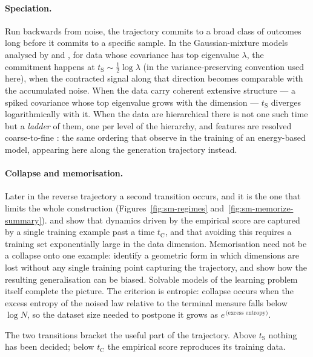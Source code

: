 \paragraph{Speciation.} Run backwards from noise, the trajectory commits to a
broad class of outcomes long before it commits to a specific sample. In the Gaussian-mixture models analysed by
\citet{biroli2024dynamical} and \citet{achilli2026speciation}, for data whose
covariance has top eigenvalue $\lambda$, the commitment happens at
$t_{\mathrm{S}} \sim \tfrac12 \log \lambda$ (in the variance-preserving
convention used here), when the contracted signal along that direction becomes
comparable with the accumulated noise. When the data carry coherent extensive
structure --- a spiked covariance whose top eigenvalue grows with the
dimension --- $t_{\mathrm{S}}$ diverges logarithmically with it. When the data are hierarchical there is not one such time but
a \emph{ladder} of them, one per level of the hierarchy, and features are
resolved coarse-to-fine \citep{sclocchi2025phase, sclocchi2025probing,
favero2025compositional, favero2025bigger}: the same ordering that
\citet{bachtis2024cascade} observe in the training of an energy-based model,
appearing here along the generation trajectory instead.

\paragraph{Collapse and memorisation.} Later in the reverse trajectory a second
transition occurs, and it is the one that limits the whole construction
(Figures~\ref{fig:sm-regimes} and~\ref{fig:sm-memorize-summary}).
\citet{biroli2024dynamical} and \citet{bonnaire2025memorize} show that dynamics
driven by the empirical score are captured by a single training example past a
time $t_{\mathrm{C}}$, and that avoiding this requires a training set
exponentially large in the data dimension. Memorisation need not be a collapse
onto one example: \citet{achilli2024losing} identify a geometric form in which
dimensions are lost without any single training point capturing the trajectory,
and \citet{garnierbrun2026biased} show how the resulting generalisation can be
biased. Solvable models of the learning problem itself
\citep{cui2025solvable} complete the picture. The criterion is entropic: collapse
occurs when the excess entropy of the noised law relative to the terminal
measure falls below $\log N$, so the dataset size needed to postpone it grows
as $e^{\,\text{(excess entropy)}}$.

The two transitions bracket the useful part of the trajectory. Above
$t_{\mathrm{S}}$ nothing has been decided; below $t_{\mathrm{C}}$ the empirical
score reproduces its training data.

